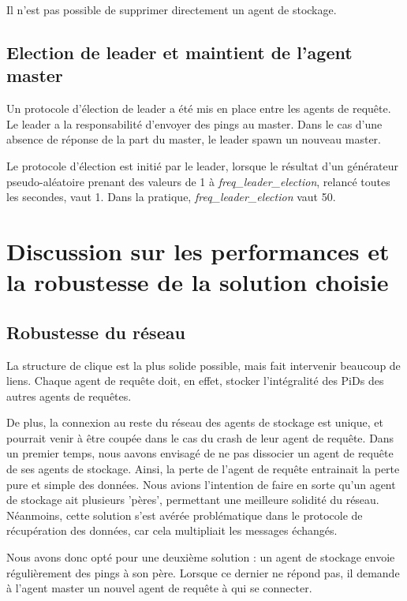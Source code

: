 \documentclass[a4paper]{article}
\begin{document}
Il n'est pas possible de supprimer directement un agent de stockage.

\subsection{Election de leader et maintient de l'agent \textbf{master}}

Un protocole d'élection de leader a été mis en place entre les agents de requête. Le leader a la responsabilité d'envoyer des pings au master.
Dans le cas d'une absence de réponse de la part du master, le leader spawn un nouveau master.

Le protocole d'élection est initié par le leader, lorsque le résultat d'un générateur pseudo-aléatoire prenant des valeurs de 1 à \emph{freq\_leader\_election}, relancé toutes les secondes, vaut 1.
Dans la pratique, \emph{freq\_leader\_election} vaut 50.

\section{Discussion sur les performances et la robustesse de la solution choisie}
\label{sec:discussion}

\subsection{Robustesse du réseau}

La structure de clique est la plus solide possible, mais fait intervenir beaucoup de liens. Chaque agent de requête doit, en effet, stocker
l'intégralité des PiDs des autres agents de requêtes.

De plus, la connexion au reste du réseau des agents de stockage est unique, et pourrait venir à être coupée dans le cas du crash de leur agent de requête.
Dans un premier temps, nous aavons envisagé de ne pas dissocier un agent de requête de ses agents de stockage.
Ainsi, la perte de l'agent de requête entrainait la perte pure et simple des données.
Nous avions l'intention de faire en sorte qu'un agent de stockage ait plusieurs 'pères', permettant une meilleure solidité du réseau.
Néanmoins, cette solution s'est avérée problématique dans le protocole de récupération des données, car cela multipliait les messages échangés.

Nous avons donc opté pour une deuxième solution : un agent de stockage envoie régulièrement des pings à son père. Lorsque ce dernier ne répond pas, il demande à l'agent master
un nouvel agent de requête à qui se connecter.
\end{document}
